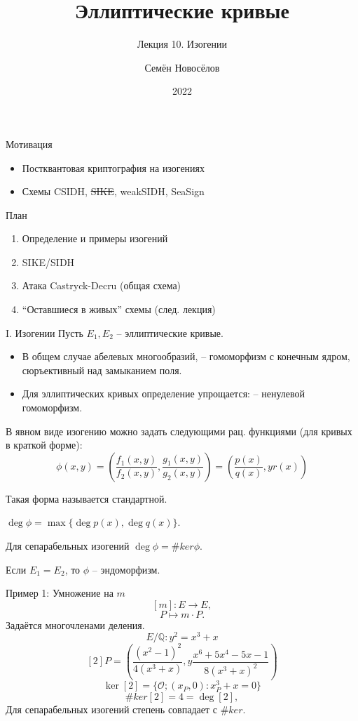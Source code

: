 \documentclass{beamer}
\title{Эллиптические кривые}
\subtitle{Лекция 10. Изогении}
\author{Семён Новосёлов}
\institute{БФУ им. И. Канта}
\date{2022}
\begin{document}
\frame{\titlepage}

\begin{frame}{Мотивация}
\begin{itemize}
    \item Постквантовая криптография на изогениях
    \item Схемы CSIDH, \sout{SIKE}, weakSIDH, SeaSign
\end{itemize}
\end{frame}

\begin{frame}{План}
\begin{enumerate}
	\item Определение и примеры изогений
	\item SIKE/SIDH
	\item Атака Castryck-Decru (общая схема)
	\item ``Оставшиеся в живых'' схемы (след. лекция)
\end{enumerate}
\end{frame}

\begin{frame}{I. Изогении}
Пусть $E_1, E_2$ -- эллиптические кривые.

\begin{itemize}
    \item В общем случае абелевых многообразий,  -- гомоморфизм с конечным ядром, сюръективный над замыканием поля.
    \item Для эллиптических кривых определение упрощается:  -- ненулевой гомоморфизм.
\end{itemize}
\end{frame}

\begin{frame}
	В явном виде изогению можно задать следующими рац. функциями (для кривых в краткой форме):
	\[
	\phi(x, y) = \left( \frac{f_1(x,y)}{f_2(x,y)}, \frac{g_1(x,y)}{g_2(x,y)} \right)
	=
	\left(
	\frac{p(x)}{q(x)}, y r(x)
	\right)
	\]
	
	Такая форма называется стандартной.

	\vspace*{1em}
	 $\deg\phi = \max\{\deg{p(x)}, \deg{q(x)}\}$.
	
	Для сепарабельных изогений $\deg\phi = \#ker\phi$.
	
	Если $E_1 = E_2$, то $\phi$ -- эндоморфизм.
\end{frame}

\begin{frame}{Пример 1: Умножение на $m$}
    \[[m]: E \rightarrow E,\]
    \[P \mapsto m \cdot P.\]
Задаётся многочленами деления.
\[E/\mathbb{Q}: y^2 = x^3 + x\]
\[
[2]P = \left( \frac{(x^2-1)^2}{4 (x^3 + x)}, y \frac{x^6 + 5 x^4 - 5 x - 1}{8 (x^3 + x)^2} \right)
\]
\[
\ker[2] = \{ \mathcal{O}; (x_P,0): x_P^3 + x = 0\}
\]
\[\#ker[2] = 4 = \deg[2],\]
Для сепарабельных изогений степень совпадает с $\#ker$.
\end{frame}
\end{document}
